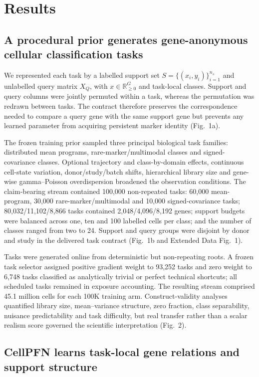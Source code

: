 \documentclass[12pt]{article}
\begin{document}
\section*{Results}

\subsection*{A procedural prior generates gene-anonymous cellular classification tasks}

We represented each task by a labelled support set $S=\{(x_i,y_i)\}_{i=1}^{n_s}$ and unlabelled query matrix $X_Q$, with $x\in\mathbb{R}_{\geq0}^{G}$ and task-local classes. Support and query columns were jointly permuted within a task, whereas the permutation was redrawn between tasks. The contract therefore preserves the correspondence needed to compare a query gene with the same support gene but prevents any learned parameter from acquiring persistent marker identity (Fig.~1a).

The frozen training prior sampled three principal biological task families: distributed mean programs, rare-marker/multimodal classes and signed-covariance classes. Optional trajectory and class-by-domain effects, continuous cell-state variation, donor/study/batch shifts, hierarchical library size and gene-wise gamma--Poisson overdispersion broadened the observation conditions. The claim-bearing stream contained 100,000 non-repeated tasks: 60,000 mean-program, 30,000 rare-marker/multimodal and 10,000 signed-covariance tasks; 80,032/11,102/8,866 tasks contained 2,048/4,096/8,192 genes; support budgets were balanced across one, ten and 100 labelled cells per class; and the number of classes ranged from two to 24. Support and query groups were disjoint by donor and study in the delivered task contract (Fig.~1b and Extended Data Fig.~1).

Tasks were generated online from deterministic but non-repeating roots. A frozen task selector assigned positive gradient weight to 93,252 tasks and zero weight to 6,748 tasks classified as analytically trivial or perfect technical shortcuts; all scheduled tasks remained in exposure accounting. The resulting stream comprised 45.1 million cells for each 100K training arm. Construct-validity analyses quantified library size, mean--variance structure, zero fraction, class separability, nuisance predictability and task difficulty, but real transfer rather than a scalar realism score governed the scientific interpretation (Fig.~2).

\subsection*{CellPFN learns task-local gene relations and support structure}
\end{document}
